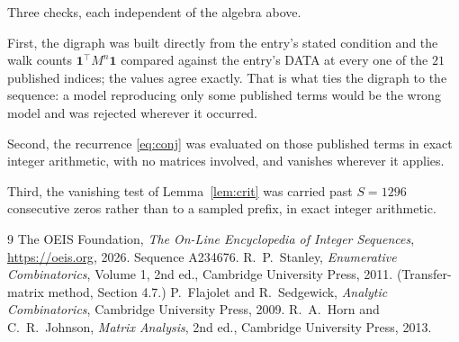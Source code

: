 \documentclass[11pt,a4paper]{article}
\theoremstyle{plain}
\theoremstyle{definition}
\begin{document}
Three checks, each independent of the algebra above.

First, the digraph was built directly from the entry's stated condition and the walk counts
$\mathbf{1}^{\!\top}M^{n}\mathbf{1}$ compared against the entry's DATA at every one of
the $21$ published indices; the values agree exactly. That is what ties the digraph to
the sequence: a model reproducing only some published terms would be the wrong model and
was rejected wherever it occurred.

Second, the recurrence \eqref{eq:conj} was evaluated on those published terms in exact
integer arithmetic, with no matrices involved, and vanishes wherever it applies.

Third, the vanishing test of Lemma~\ref{lem:crit} was carried past $S=1296$ consecutive
zeros rather than to a sampled prefix, in exact integer arithmetic.

\begin{thebibliography}{9}
 The OEIS Foundation, \emph{The On-Line Encyclopedia of Integer
Sequences}, \url{https://oeis.org}, 2026. Sequence A234676.
 R.~P.~Stanley, \emph{Enumerative Combinatorics}, Volume 1, 2nd ed.,
Cambridge University Press, 2011. (Transfer-matrix method, Section 4.7.)
 P.~Flajolet and R.~Sedgewick, \emph{Analytic Combinatorics}, Cambridge
University Press, 2009.
 R.~A.~Horn and C.~R.~Johnson, \emph{Matrix Analysis}, 2nd ed., Cambridge
University Press, 2013.
\end{thebibliography}
\end{document}
